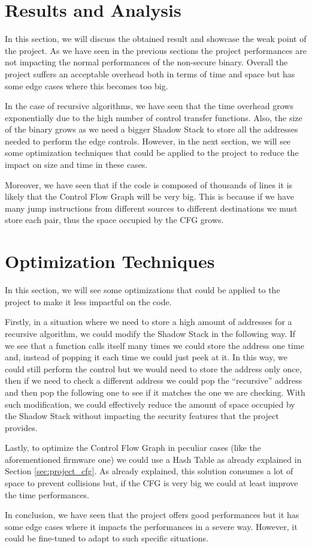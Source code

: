 \section{Results and Analysis}
\label{sec:pa_results}

In this section, we will discuss the obtained result and showcase the weak point
of the project. As we have seen in the previous sections the project
performances are not impacting the normal performances of the non-secure binary.
Overall the project suffers an acceptable overhead both in terms of time and space
but has some edge cases where this becomes too big.

In the case of recursive algorithms, we have seen that the time overhead grows
exponentially due to the high number of control transfer functions. Also, the
size of the binary grows as we need a bigger Shadow Stack to store all the
addresses needed to perform the edge controls. However, in the next section, we will
see some optimization techniques that could be applied to the project to reduce the
impact on size and time in these cases.

Moreover, we have seen that if the code is composed of thousands of lines it is
likely that the Control Flow Graph will be very big. This is because if we have many
jump instructions from different sources to different destinations we must store
each pair, thus the space occupied by the CFG grows.

\section{Optimization Techniques}
\label{sec:pa_optimization}

In this section, we will see some optimizations that could be applied to the
project to make it less impactful on the code.

Firstly, in a situation where we need to store a high amount of addresses for a recursive
algorithm, we could modify the Shadow Stack in the following way. If we see that
a function calls itself many times we could store the address one time and,
instead of popping it each time we could just peek at it. In this way, we could
still perform the control but we would need to store the address only once, then
if we need to check a different address we could pop the ``recursive'' address and
then pop the following one to see if it matches the one we are checking. With
such modification, we could effectively reduce the amount of space occupied by the
Shadow Stack without impacting the security features that the project provides.

Lastly, to optimize the Control Flow Graph in peculiar cases (like the aforementioned
firmware one) we could use a Hash Table as already explained in Section
\ref{sec:project_cfg}. As already explained, this solution consumes a lot of
space to prevent collisions but, if the CFG is very big we could at least improve
the time performances.

In conclusion, we have seen that the project offers good performances but it has
some edge cases where it impacts the performances in a severe way. However, it
could be fine-tuned to adapt to such specific situations.
